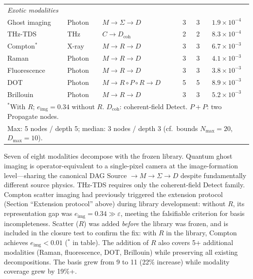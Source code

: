 \documentclass[11pt]{article}
\newcommand{\etier}{e_{\mathrm{img}}}
\newcommand{\Nmax}{N_{\max}}
\newcommand{\Dmax}{D_{\max}}
\begin{document}
\begin{table}[h]
\begin{tabular}{@{}llllcc@{}}
\midrule
\multicolumn{6}{l}{\textit{Exotic modalities}} \\
Ghost imaging    & Photon   & $M \!\to\! \Sigma \!\to\! D$              & 3 & 3 & $1.9 \times 10^{-4}$ \\
THz-TDS          & THz      & $C \!\to\! D_{\mathrm{coh}}$              & 2 & 2 & $8.3 \times 10^{-4}$ \\
Compton$^{*}$    & X-ray    & $M \!\to\! R \!\to\! D$                   & 3 & 3 & $6.7 \times 10^{-3}$ \\
Raman            & Photon   & $M \!\to\! R \!\to\! D$                   & 3 & 3 & $4.1 \times 10^{-3}$ \\
Fluorescence     & Photon   & $M \!\to\! R \!\to\! D$                   & 3 & 3 & $3.8 \times 10^{-3}$ \\
DOT              & Photon   & $M \!\to\! R \!\circ\! P \!\circ\! R \!\to\! D$ & 5 & 5 & $8.9 \times 10^{-3}$ \\
Brillouin        & Photon   & $M \!\to\! R \!\to\! D$                   & 3 & 3 & $5.2 \times 10^{-3}$ \\
\bottomrule
\multicolumn{6}{l}{\footnotesize $^{*}$With $R$; $\etier = 0.34$ without $R$. $D_{\mathrm{coh}}$: coherent-field Detect. $P{+}P$: two Propagate nodes.}\\
\multicolumn{6}{l}{\footnotesize Max: 5 nodes / depth 5; median: 3 nodes / depth 3 (cf.\ bounds $\Nmax\!=\!20$, $\Dmax\!=\!10$).}
\end{tabular}
\end{table}

\noindent Seven of eight modalities decompose with the frozen library. Quantum ghost imaging is operator-equivalent to a single-pixel camera at the image-formation level---sharing the canonical DAG Source $\to M \to \Sigma \to D$ despite fundamentally different source physics. THz-TDS requires only the coherent-field Detect family. Compton scatter imaging had previously triggered the extension protocol (Section ``Extension protocol'' above) during library development: without $R$, its representation gap was $\etier = 0.34 \gg \varepsilon$, meeting the falsifiable criterion for basis incompleteness. Scatter ($R$) was added \emph{before} the library was frozen, and is included in the closure test to confirm the fix: with $R$ in the library, Compton achieves $\etier < 0.01$ ($^*$ in table). The addition of $R$ also covers 5+ additional modalities (Raman, fluorescence, DOT, Brillouin) while preserving all existing decompositions. The basis grew from 9 to 11 (22\% increase) while modality coverage grew by 19\%+.
\end{document}
